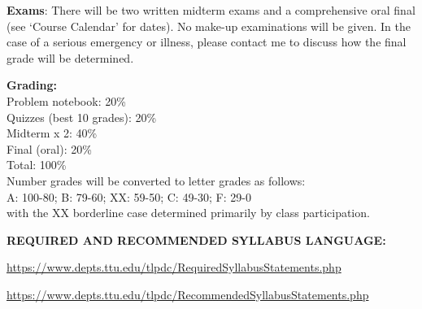 \documentclass[11pt]{NSF}
\begin{document}
{\bf Exams}:
There will be two written midterm exams and a comprehensive 
oral final (see `Course Calendar' for dates).
No make-up examinations will be given. In the case of a
serious emergency or illness, please contact me to discuss how 
the final grade will be determined.

{\bf Grading:}\\
Problem notebook: 20\%\\
Quizzes (best 10 grades): 20\%\\ 
Midterm x 2: 40\%\\
Final (oral): 20\%\\ 
Total: 100\%\\
Number grades will be converted to letter grades as follows:\\
A: 100-80; B: 79-60; XX: 59-50; C: 49-30; F: 29-0\\ 
with the XX borderline case determined primarily by class participation.

{\bf REQUIRED AND RECOMMENDED SYLLABUS LANGUAGE:}

\url{https://www.depts.ttu.edu/tlpdc/RequiredSyllabusStatements.php}

\url{https://www.depts.ttu.edu/tlpdc/RecommendedSyllabusStatements.php}
\end{document}
